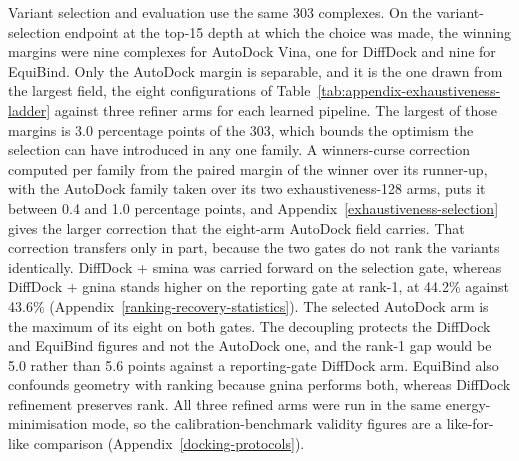 Variant selection and evaluation use the same 303 complexes. On the variant-selection endpoint at the top-15 depth at which the choice was made, the winning margins were nine complexes for AutoDock Vina, one for DiffDock and nine for EquiBind. Only the AutoDock margin is separable, and it is the one drawn from the largest field, the eight configurations of Table~\ref{tab:appendix-exhaustiveness-ladder} against three refiner arms for each learned pipeline. The largest of those margins is 3.0 percentage points of the 303, which bounds the optimism the selection can have introduced in any one family. A winner\textquotesingle s-curse correction computed per family from the paired margin of the winner over its runner-up, with the AutoDock family taken over its two exhaustiveness-128 arms, puts it between 0.4 and 1.0 percentage points, and Appendix~\ref{exhaustiveness-selection} gives the larger correction that the eight-arm AutoDock field carries. That correction transfers only in part, because the two gates do not rank the variants identically. DiffDock + smina was carried forward on the selection gate, whereas DiffDock + gnina stands higher on the reporting gate at rank-1, at 44.2\% against 43.6\% (Appendix~\ref{ranking-recovery-statistics}). The selected AutoDock arm is the maximum of its eight on both gates. The decoupling protects the DiffDock and EquiBind figures and not the AutoDock one, and the rank-1 gap would be 5.0 rather than 5.6 points against a reporting-gate DiffDock arm. EquiBind also confounds geometry with ranking because gnina performs both, whereas DiffDock refinement preserves rank. All three refined arms were run in the same energy-minimisation mode, so the calibration-benchmark validity figures are a like-for-like comparison (Appendix~\ref{docking-protocols}).

